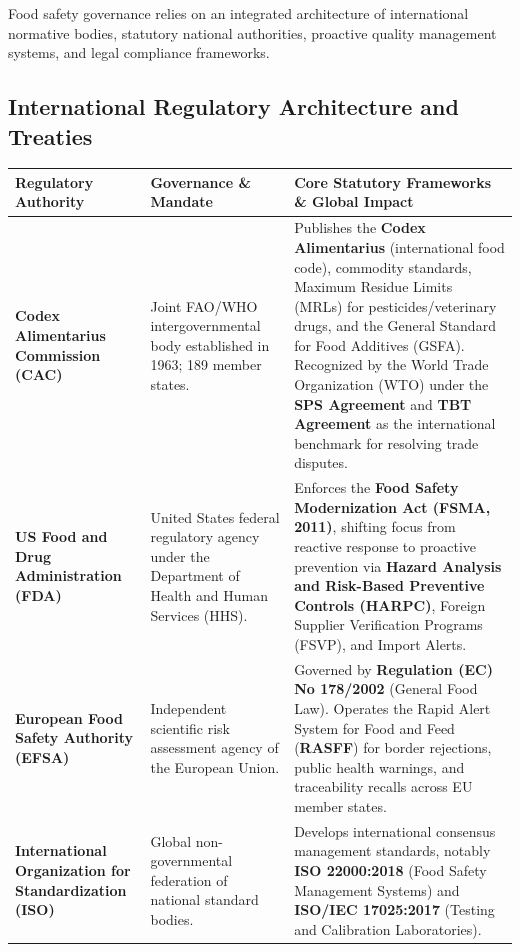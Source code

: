 \documentclass[11pt,a4paper,oneside]{article}
\begin{document}
Food safety governance relies on an integrated architecture of international normative bodies, statutory national authorities, proactive quality management systems, and legal compliance frameworks.

\subsection{International Regulatory Architecture and Treaties}

\begin{center}
\begin{tabular}{@{}p{3.2cm} p{4.2cm} p{8.6cm}@{}}
\toprule
\textbf{Regulatory Authority} & \textbf{Governance \& Mandate} & \textbf{Core Statutory Frameworks \& Global Impact} \tabularnewline
\midrule
\textbf{Codex Alimentarius Commission (CAC)} & Joint FAO/WHO intergovernmental body established in 1963; 189 member states. & Publishes the \textbf{Codex Alimentarius} (international food code), commodity standards, Maximum Residue Limits (MRLs) for pesticides/veterinary drugs, and the General Standard for Food Additives (GSFA). Recognized by the World Trade Organization (WTO) under the \textbf{SPS Agreement} and \textbf{TBT Agreement} as the international benchmark for resolving trade disputes. \tabularnewline
\textbf{US Food and Drug Administration (FDA)} & United States federal regulatory agency under the Department of Health and Human Services (HHS). & Enforces the \textbf{Food Safety Modernization Act (FSMA, 2011)}, shifting focus from reactive response to proactive prevention via \textbf{Hazard Analysis and Risk-Based Preventive Controls (HARPC)}, Foreign Supplier Verification Programs (FSVP), and Import Alerts. \tabularnewline
\textbf{European Food Safety Authority (EFSA)} & Independent scientific risk assessment agency of the European Union. & Governed by \textbf{Regulation (EC) No 178/2002} (General Food Law). Operates the Rapid Alert System for Food and Feed (\textbf{RASFF}) for border rejections, public health warnings, and traceability recalls across EU member states. \tabularnewline
\textbf{International Organization for Standardization (ISO)} & Global non-governmental federation of national standard bodies. & Develops international consensus management standards, notably \textbf{ISO 22000:2018} (Food Safety Management Systems) and \textbf{ISO/IEC 17025:2017} (Testing and Calibration Laboratories). \tabularnewline
\bottomrule
\end{tabular}
\end{center}
\end{document}
